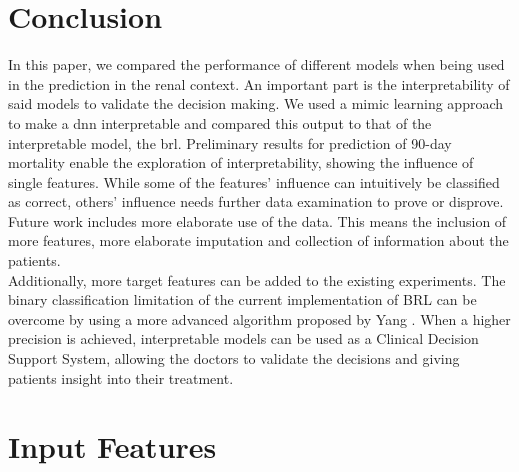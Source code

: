\documentclass[conference,comsoc]{IEEEtran}
\begin{document}
\section{Conclusion}
In this paper, we compared the performance of different models when being used in the prediction in the renal context.
An important part is the interpretability of said models to validate the decision making.
We used a mimic learning approach to make a \gls{dnn} interpretable and compared this output to that of the interpretable model, the \gls{brl}.
Preliminary results for prediction of 90-day mortality enable the exploration of interpretability, showing the influence of single features.
While some of the features' influence can intuitively be classified as correct, others' influence needs further data examination to prove or disprove. \\

Future work includes more elaborate use of the data. 
This means the inclusion of more features, more elaborate imputation and collection of information about the patients. \\
Additionally, more target features can be added to the existing experiments. 
The binary classification limitation of the current implementation of BRL can be overcome by using a more advanced algorithm proposed by Yang \cite{Yang2016}.
When a higher precision is achieved, interpretable models can be used as a Clinical Decision Support System, allowing the doctors to validate the decisions and giving patients insight into their treatment.




\onecolumn

\appendices
\section{Input Features}
\label{app:input}
\end{document}

